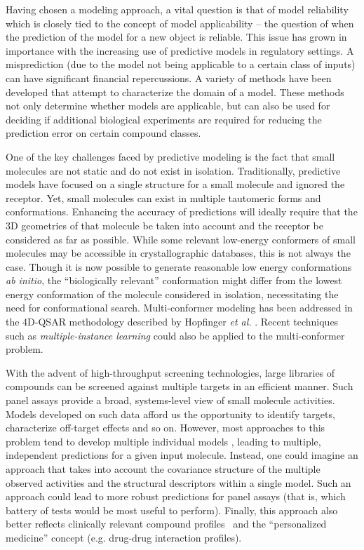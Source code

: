 \documentclass{../sig-alternate}
\begin{document}
Having chosen a modeling approach, a vital question is that of model
reliability which is closely tied to the concept of model
applicability -- the question of when the prediction of the model for
a new object is reliable. This issue has grown in importance with the
increasing use of predictive models in regulatory settings. A
misprediction (due to the model not being applicable to a certain class
of inputs) can have significant financial repercussions. A variety of
methods have been developed that attempt to characterize the domain of
a model. These methods not only determine whether models are
applicable, but can also be used for deciding if additional biological
experiments are required for reducing the prediction error on certain
compound classes.

One of the key challenges faced by predictive modeling is the fact
that small molecules are not static and do not exist in isolation.
Traditionally, predictive models have focused on a single structure
for a small molecule and ignored the receptor. Yet, small molecules
can exist in multiple tautomeric forms and conformations. 
Enhancing the accuracy of predictions
will ideally require that the 3D geometries of that molecule be taken
into account and the receptor be considered as far as possible.  
While some relevant low-energy conformers of small
molecules may be accessible in crystallographic databases, this is
not always the case. Though it is now possible to generate reasonable
low energy conformations \emph{ab initio}, the
``biologically relevant'' conformation might differ from the lowest
energy conformation of the molecule considered in isolation,
necessitating the need for conformational search.  Multi-conformer
modeling has been addressed in the 4D-QSAR methodology described by
Hopfinger \textit{et al.}  \cite{Albuquerque:1998ys}.  Recent
techniques such as \emph{multiple-instance learning} could also be
applied to the multi-conformer problem.

With the advent of high-throughput screening technologies, large
libraries of compounds can be screened against multiple targets in an
efficient manner. Such panel assays provide a broad, systems-level
view of small molecule activities.  Models developed on such data
afford us the opportunity to identify targets, characterize off-target
effects and so on. However, most approaches to this problem tend to
develop multiple individual models \cite{Chen:2010zr}, leading to
multiple, independent predictions for a given input molecule.
Instead, one could imagine an approach that takes into account the
covariance structure of the multiple observed activities and the
structural descriptors within a single model. Such an approach could
lead to more robust predictions for panel assays (that is, which
battery of tests would be most useful to perform). Finally, this
approach also better reflects clinically relevant compound
profiles~\cite{kuhn2010} and the ``personalized medicine'' concept
(e.g. drug-drug interaction profiles).
\end{document}
